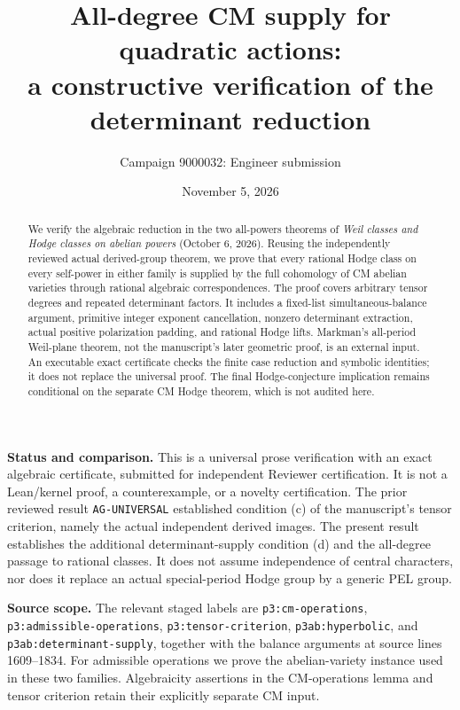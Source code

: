 \documentclass[11pt]{article}
\title{All-degree CM supply for quadratic actions:\\
a constructive verification of the determinant reduction}
\author{Campaign 9000032: Engineer submission}
\date{November 5, 2026}
\theoremstyle{remark}
\begin{document}
\maketitle

\begin{abstract}
We verify the algebraic reduction in the two all-powers theorems of
\emph{Weil classes and Hodge classes on abelian powers}
(October 6, 2026). Reusing the independently reviewed actual derived-group
theorem, we prove that every rational Hodge class on every self-power in
either family is supplied by the full cohomology of CM abelian varieties
through rational algebraic correspondences. The proof covers arbitrary
tensor degrees and repeated determinant factors. It includes a fixed-list
simultaneous-balance argument, primitive integer exponent cancellation,
nonzero determinant extraction, actual positive polarization padding, and
rational Hodge lifts. Markman's all-period Weil-plane theorem, not the
manuscript's later geometric proof, is an external input.
An executable exact certificate checks the finite case reduction and
symbolic identities; it does not replace the universal proof.
The final Hodge-conjecture implication remains conditional on the separate
CM Hodge theorem, which is not audited here.
\end{abstract}

\noindent\textbf{Status and comparison.}
This is a universal prose verification with an exact algebraic certificate,
submitted for independent Reviewer certification. It is not a Lean/kernel
proof, a counterexample, or a novelty certification.
The prior reviewed result \texttt{AG-UNIVERSAL} established condition (c)
of the manuscript's tensor criterion, namely the actual independent
derived images. The present result establishes the additional
determinant-supply condition (d) and the all-degree passage to rational
classes. It does not assume independence of central characters, nor does
it replace an actual special-period Hodge group by a generic PEL group.

\medskip
\noindent\textbf{Source scope.}
The relevant staged labels are \texttt{p3:cm-operations},
\texttt{p3:admissible-operations}, \texttt{p3:tensor-criterion},
\texttt{p3ab:hyperbolic}, and \texttt{p3ab:determinant-supply},
together with the balance arguments at source lines 1609--1834.
For admissible operations we prove the abelian-variety instance used
in these two families. Algebraicity assertions in the CM-operations
lemma and tensor criterion retain their explicitly separate CM input.
\end{document}
